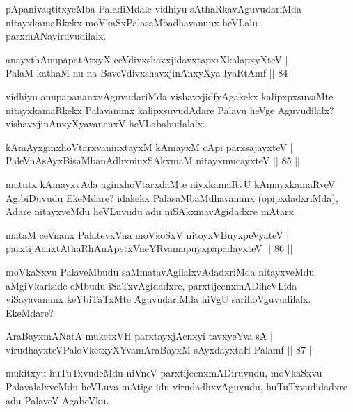 \begin{artha}
pApanivaqtitxyeMba PaladiMdale vidhiyu sAthaRkavAguvudariMda nitayxkamaRkekx moVkaSxPalasaMbadhavanunx heVLalu parxmANaviruvudilalx.
\end{artha}

\begin{shl}
anayxthA\s nupapatAtxyX ceVdivxshavxjidavxtapxrXkalapxyXteV |\\
PalaM kathaM nu na BaveVdivxshavxjinAnxyXya IyaRtAmf \hfill || 84 ||
\end{shl}

\begin{artha}
vidhiyu anupapananxvAguvudariMda vishavxjidfyAgakekx kalipxpxsuvaMte nitayxkamaRkekx Palavanunx kalipxsuvudAdare Palavu heVge Aguvudilalx? vishavxjinAnxyXyavanenxV heVLabahudalalx.
\end{artha}

\begin{shl}
kAmAyxginxhoVtarxvaninxtayxM kAmayxM cApi parxsajayxteV |\\
PaleVnAsAyxBisaMbanAdhxninxSAkxmaM nitayxmucayxteV \hfill || 85 ||
\end{shl}

\begin{artha}
matutx kAmayxvAda aginxhoVtarxdaMte niyxkamaRvU kAmayxkamaRveV AgibiDuvudu EkeMdare? idakekx PalasaMbaMdhavanunx (opipxdadxriMda), Adare nitayxveMdu heVLuvudu adu niSAkxmavAgidadxre mAtarx.
\end{artha}

\begin{shl}
mataM ceVnanx PalatevxVna moVkoSxV nitoyxV\s BuyxpeVyateV |\\
parxtijAcnxtAthaRhAnApetxVneYRvamapuyxpapadayxteV \hfill || 86 ||
\end{shl}

\begin{artha}
moVkaSxvu PalaveMbudu saMmatavAgilalxvAdadxriMda nitayxveMdu aMgiVkariside eMbudu iSaTxvAgidadxre, parxtijecnxmADiheVLida viSayavanunx keYbiTaTxMte AguvudariMda hiVgU sarihoVguvudilalx. EkeMdare?
\end{artha}

\begin{shl}
AraBayxmANatA muketxVH parxtayxjAcnxyi tavxyeYva sA |\\
virudhayxteV\s PaloVketxyXYvamAraBayxM sAyxdayxtaH Palamf \hfill || 87 ||
\end{shl}

\begin{artha}
mukitxyu huTuTxvudeMdu niVneV parxtijecnxmADiruvudu, moVkaSxvu PalavalalxveMdu heVLuva mAtige idu virudadhxvAguvudu, huTuTxvudidadxre adu PalaveV AgabeVku.
\end{artha}

